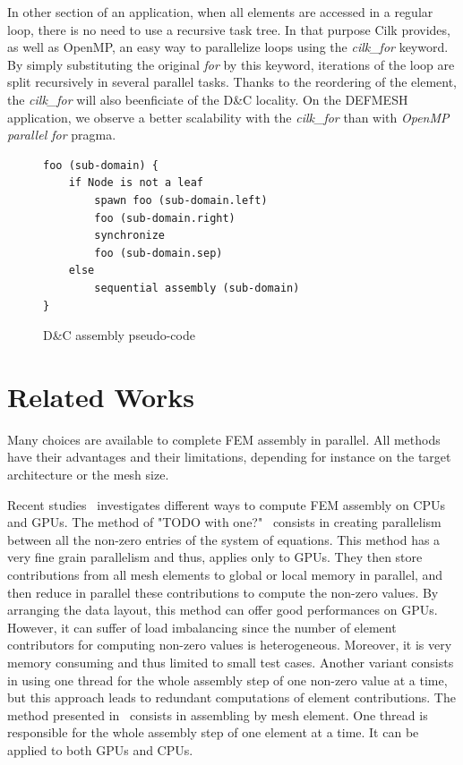 \documentclass{IOS-Book-Article}
\begin{document}
In other section of an application, when all elements are accessed in a regular loop, there is no need to use a recursive task tree. In that purpose Cilk provides, as well as OpenMP, an easy way to parallelize loops using the \emph{cilk\_for} keyword. By simply substituting the original \emph{for} by this keyword, iterations of the loop are split recursively in several parallel tasks. Thanks to the reordering of the element, the \emph{cilk\_for} will also beenficiate of the D\&C locality. On the DEFMESH application, we observe a better scalability with the \emph{cilk\_for} than with \emph{OpenMP parallel for} pragma.
\begin{figure}[htp]
 \begin{verbatim}
foo (sub-domain) {
    if Node is not a leaf
        spawn foo (sub-domain.left)
        foo (sub-domain.right)
        synchronize
        foo (sub-domain.sep)
    else
        sequential assembly (sub-domain)
}
 \end{verbatim}
 \caption{D\&C assembly pseudo-code}
 \label{fig:DCcode}
\end{figure}

\section{Related Works}
Many choices are available to complete FEM assembly in parallel.
All methods have their advantages and their limitations, depending for instance on the target architecture or the mesh size.

Recent studies~\cite{cecka2011assembly,CPUGPUasm} investigates different ways to compute FEM assembly on CPUs and GPUs.
The method of "TODO with one?"~\cite{} consists in creating parallelism between all the non-zero entries of the system of equations.
This method has a very fine grain parallelism and thus, applies only to GPUs. They then store contributions from all mesh elements to global or local memory in parallel, and then reduce in parallel these contributions to compute the non-zero values.
By arranging the data layout, this method can offer good performances on GPUs.
However, it can suffer of load imbalancing since the number of element contributors for computing non-zero values is heterogeneous.
Moreover, it is very memory consuming and thus limited to small test cases.
Another variant consists in using one thread for the whole assembly step of one non-zero value at a time, but this approach leads to redundant computations of element
contributions.
The method presented in~\cite{} consists in assembling by mesh element. One thread is responsible for the whole assembly step of one element at a time. It can be applied to both GPUs and CPUs.
\end{document}
